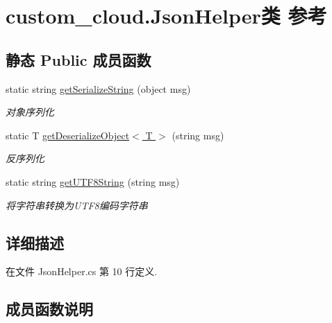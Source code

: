 \hypertarget{classcustom__cloud_1_1_json_helper}{}\section{custom\+\_\+cloud.\+Json\+Helper类 参考}
\label{classcustom__cloud_1_1_json_helper}
\subsection*{静态 Public 成员函数}
\begin{DoxyCompactItemize}
\item 
static string \hyperlink{classcustom__cloud_1_1_json_helper_a46e5bb39af49231a36f71bb4df16905b}{get\+Serialize\+String} (object msg)
\begin{DoxyCompactList}\small\item\em 对象序列化 \end{DoxyCompactList}\item 
static T \hyperlink{classcustom__cloud_1_1_json_helper_adbe846e8b537a3ec57cc87c5aead2a81}{get\+Deserialize\+Object$<$ T $>$} (string msg)
\begin{DoxyCompactList}\small\item\em 反序列化 \end{DoxyCompactList}\item 
static string \hyperlink{classcustom__cloud_1_1_json_helper_a5fbe80a07a71ee67e1fb79194661c50d}{get\+U\+T\+F8\+String} (string msg)
\begin{DoxyCompactList}\small\item\em 将字符串转换为\+U\+T\+F8编码字符串 \end{DoxyCompactList}\end{DoxyCompactItemize}


\subsection{详细描述}


在文件 Json\+Helper.\+cs 第 10 行定义.



\subsection{成员函数说明}
\mbox{\label{classcustom__cloud_1_1_json_helper_adbe846e8b537a3ec57cc87c5aead2a81}} 
